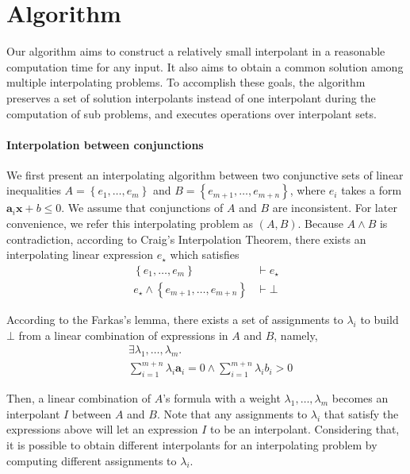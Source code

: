 \section{Algorithm}

Our algorithm aims to construct a relatively small interpolant in a
reasonable computation time for any input.  It also aims to obtain a
common solution among multiple interpolating problems.
To accomplish these goals, the algorithm preserves a set of solution
interpolants instead of one interpolant during the computation of sub
problems, and executes operations over interpolant sets.


\paragraph{Interpolation between conjunctions}
We first present an interpolating algorithm between two conjunctive
sets of linear inequalities $A = \left\lbrace e_1,\ldots,e_m
\right\rbrace$ and $B = \left\lbrace e_{m+1},\ldots,e_{m+n}
\right\rbrace$, where $e_i$ takes a form $\mathbf{a}_i \mathbf{x} + b
\leq 0$.  We assume that conjunctions of $A$ and $B$ are inconsistent.
For later convenience, we refer this interpolating problem as $\left(
A, B \right)$.  Because $A \wedge B$ is contradiction, according to
Craig's Interpolation Theorem, there exists an interpolating linear
expression $e_\star$ which satisfies
\begin{align*}
\left\lbrace e_1,\ldots,e_m \right\rbrace & \vdash e_\star \\
e_\star \wedge \left\lbrace e_{m+1},\ldots,e_{m+n} \right\rbrace & \vdash \bot
\end{align*}

According to the Farkas's lemma, there exists a set of assignments to
$\lambda_i$ to build $\bot$ from a linear combination of expressions
in $A$ and $B$, namely,
\begin{align*}
& \exists \lambda_1, \ldots, \lambda_m. \\
& \sum_{i=1}^{m+n} \lambda_i \mathbf{a}_i = 0\wedge \sum_{i=1}^{m+n} \lambda_i b_i > 0
\end{align*}

Then, a linear combination of $A$'s formula with a weight $\lambda_1,
\ldots, \lambda_m$ becomes an interpolant $I$ between $A$ and $B$.
Note that any assignments to $\lambda_i$ that satisfy the expressions
above will let an expression $I$ to be an interpolant.  Considering
that, it is possible to obtain different interpolants for an
interpolating problem by computing different assignments to
$\lambda_i$.

